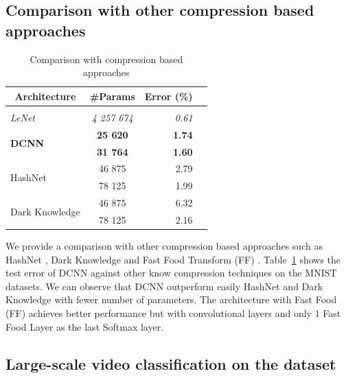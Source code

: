 \subsection{Comparison with other compression based approaches}


\begin{table}
  \centering
    \caption{Comparison with compression based approaches}
    \begin{tabular}{lcrc}
    \toprule
    \multicolumn{1}{c}{\textbf{Architecture}} & \multicolumn{1}{c}{\textbf{\#Params}} & \textbf{Error (\%)} \\
    \hline \\
    \textit{LeNet \cite{Lecun98gradient-basedlearning}} & \textit{4 257 674} & \textit{0.61} \\
    \multirow{2}[0]{*}{\textbf{DCNN}} & \textbf{25 620} & \textbf{1.74} \\
          & \textbf{31 764} & \textbf{1.60} \\
    \multirow{2}[0]{*}{HashNet \cite{Chen_Hashing_Trick}} & 46 875 & 2.79 \\
          &  78 125 & 1.99 \\
    \multirow{2}[0]{*}{Dark Knowledge \cite{44873}} & 46 875 & 6.32 \\
          &  78 125 & 2.16 \\
    \bottomrule
    \end{tabular}%
  \label{tab:mnist}%
\end{table}%


We provide a comparison with other compression based approaches such as HashNet \cite{Chen_Hashing_Trick}, Dark Knowledge \cite{44873} and Fast Food Transform (FF) \cite{7410530}. 
Table~\ref{tab:mnist} shows the test error of DCNN against other know compression techniques on the MNIST datasets. We can observe that DCNN outperform easily HashNet \cite{Chen_Hashing_Trick} and Dark Knowledge \cite{44873} with fewer number of parameters. The architecture with Fast Food (FF) \cite{7410530} achieves better performance but with convolutional layers and only $1$ Fast Food Layer as the last Softmax layer. 


\subsection{Large-scale video classification on the \yt dataset}

